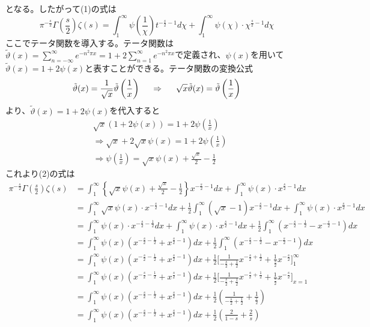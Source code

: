\documentclass{jsarticle}
\begin{document}
となる。したがって(1)の式は
\begin{equation}
\pi^{-\frac{s}{2}}\Gamma\left(\frac{s}{2}\right)\zeta(s)=\int_{1}^{\infty}\psi\left(\frac{1}{\chi}\right)t^{-\frac{s}{2}-1}d\chi+\int_{1}^{\infty}\psi(\chi)\cdot\chi^{\frac{s}{2}-1}d\chi
\end{equation}
ここでテータ関数を導入する。テータ関数は\(\displaystyle\tilde{\vartheta}(x)=\sum_{n=-\infty}^{\infty}e^{-n^{2}\pi x}=1+2\sum_{n=1}^{\infty}e^{-n^{2}\pi x}\)で定義され、\(\psi(x)\)を用いて\(\tilde{\vartheta}(x)=1+2\psi(x)\)と表すことができる。テータ関数の変換公式
\[\tilde{\vartheta}(x)=\frac{1}{\sqrt{x}}\tilde{\vartheta}\left(\frac{1}{x}\right)\hspace{5mm}\Rightarrow\hspace{5mm}\sqrt{x}\tilde{\vartheta}(x)=\tilde{\vartheta}\left(\frac{1}{x}\right)\]
より、\(\tilde{\vartheta}(x)=1+2\psi(x)\)を代入すると
\begin{align*}
&\sqrt{x}(1+2\psi(x))=1+2\psi\left(\frac{1}{x}\right)\\
&\Rightarrow\sqrt{x}+2\sqrt{x}\psi(x)=1+2\psi\left(\frac{1}{x}\right)\\
&\Rightarrow\psi\left(\frac{1}{x}\right)=\sqrt{x}\psi(x)+\frac{\sqrt{x}}{2}-\frac{1}{2}
\end{align*}
これより(2)の式は
\begin{align*}
\pi^{-\frac{s}{2}}\Gamma\left(\frac{s}{2}\right)\zeta(s)&=\int_{1}^{\infty}\left\{\sqrt{x}\psi(x)+\frac{\sqrt{x}}{2}-\frac{1}{2}\right\}x^{-\frac{s}{2}-1}dx+\int_{1}^{\infty}\psi(x)\cdot x^{\frac{s}{2}-1}dx\\
&=\int_{1}^{\infty}\sqrt{x}\psi(x)\cdot x^{-\frac{s}{2}-1}dx+\frac{1}{2}\int_{1}^{\infty}(\sqrt{x}-1)x^{-\frac{s}{2}-1}dx+\int_{1}^{\infty}\psi(x)\cdot x^{\frac{s}{2}-1}dx\\
&=\int_{1}^{\infty}\psi(x)\cdot x^{-\frac{s}{2}-\frac{1}{2}}dx+\int_{1}^{\infty}\psi(x)\cdot x^{\frac{s}{2}-1}dx+\frac{1}{2}\int_{1}^{\infty}\left(x^{-\frac{s}{2}-\frac{1}{2}}-x^{-\frac{s}{2}-1}\right)dx\\
&=\int_{1}^{\infty}\psi(x)\left(x^{-\frac{s}{2}-\frac{1}{2}}+x^{\frac{s}{2}-1}\right)dx+\frac{1}{2}\int_{1}^{\infty}\left(x^{-\frac{s}{2}-\frac{1}{2}}-x^{-\frac{s}{2}-1}\right)dx\\
&=\int_{1}^{\infty}\psi(x)\left(x^{-\frac{s}{2}-\frac{1}{2}}+x^{\frac{s}{2}-1}\right)dx+\frac{1}{2}\Biggl[\frac{1}{-\frac{s}{2}+\frac{1}{2}}x^{-\frac{s}{2}+\frac{1}{2}}+\frac{1}{\frac{s}{2}}x^{-\frac{s}{2}}\Biggr]_{1}^{\infty}\\
&=\int_{1}^{\infty}\psi(x)\left(x^{-\frac{s}{2}-\frac{1}{2}}+x^{\frac{s}{2}-1}\right)dx+\frac{1}{2}\Biggl[\frac{1}{-\frac{s}{2}+\frac{1}{2}}x^{-\frac{s}{2}+\frac{1}{2}}+\frac{1}{\frac{s}{2}}x^{-\frac{s}{2}}\Biggr]_{x=1}\\
&=\int_{1}^{\infty}\psi(x)\left(x^{-\frac{s}{2}-\frac{1}{2}}+x^{\frac{s}{2}-1}\right)dx+\frac{1}{2}\left(\frac{1}{-\frac{s}{2}+\frac{1}{2}}+\frac{1}{\frac{s}{2}}\right)\\
&=\int_{1}^{\infty}\psi(x)\left(x^{-\frac{s}{2}-\frac{1}{2}}+x^{\frac{s}{2}-1}\right)dx+\frac{1}{2}\left(\frac{2}{1-s}+\frac{2}{s}\right)
\end{align*}
\end{document}
